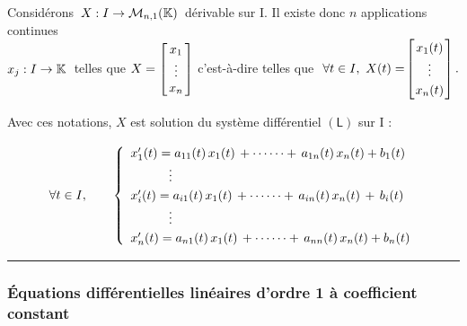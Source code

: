 \newpage

Considérons \(\,X:I\to\mathcal{M}_{n,1}(\mathbb{K})\,\) dérivable sur I. Il existe donc $n$ applications continues\\
\(x_j:I\to \mathbb{K} \: \) telles que \(X=\arraycolsep=0.05cm\def\arraystretch{1} \left[
\begin{array}{c}
    x_1\\
    \vdots\\
    x_n
\end{array}    
\right]\) c'est-à-dire telles que \(\ \forall t \in I,\ X(t)=\!\arraycolsep=0.03cm\def\arraystretch{1.2}\left[
    \begin{array}{c}
        x_1(t)\\
        \vdots\\
        x_n(t)
    \end{array}    
    \right].\)

\vspace{1cm}

Avec ces notations, $X$ est solution du système différentiel $(\mathsf{L})$ sur I \ssi :\vspace{0.2cm}

\[\forall t\in I, \qquad \left\{\def\arraystretch{1.2}
\begin{array}{l}
    x'_1(t)=a_{11}(t)\,x_1(t)\,+\cdots\cdots+\,a_{1n}(t)\,x_n(t)+b_1(t)\\
    \hspace{1.07cm} \vdots\\
    x'_i(t)=a_{i1}(t)\,x_1(t)\,+\cdots\cdots+\,a_{in}(t)\,x_n(t)\,+\,b_i(t)\\
    \hspace{1.07cm} \vdots\\
    x'_n(t)=a_{n1}(t)\,x_1(t)\,+\cdots\cdots+\,a_{nn}(t)\,x_n(t)+b_n(t)
\end{array}
\right.\]

\vspace{1cm}

\hrule

\vspace{1cm}

\subsubsection[EDLO1 à coefficient constant]{Équations différentielles linéaires d'ordre 1 à coefficient constant}

\vspace{0.7cm}

